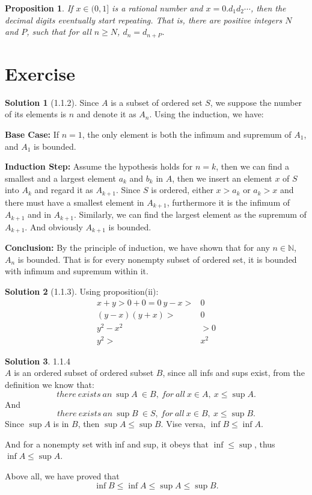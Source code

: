 \documentclass{article}
\newtheorem{proposition}{Proposition}[section]
\theoremstyle{definition}
\newtheorem{sol}{Solution}[exe]
\begin{document}
\begin{proposition}
    If $x\in (0,1]$ is a rational number and $x=0.d_{1}d_{2}\cdots$, then the decimal digits eventually start repeating. That is, there are 
    positive integers $N$ and $P$, such that for all $n\geq N$, $d_{n}=d_{n+P}$.
\end{proposition}


\newpage
\section{Exercise}

\begin{sol}[1.1.2]
    Since $A$ is a subset of ordered set $S$, we suppose the number of its elements is $n$ and denote it as $A_{n}$. Using the induction, we have:

    \noindent\textbf{Base Case:} If $n=1$, the only element is both the infimum and supremum of $A_{1}$, and $A_{1}$ is bounded.

    \noindent\textbf{Induction Step:} Assume the hypothesis holds for $n=k$, then we can find a smallest and a largest element $a_{k}$ and $b_{k}$ in $A$, 
    then we insert an element $x$ of $S$ into $A_{k}$ and regard it as $A_{k+1}$. Since $S$ is ordered, either $x>a_{k}$ or $a_{k}>x$ and there must have a smallest element in $A_{k+1}$, furthermore it is the infimum of $A_{k+1}$ and in $A_{k+1}$.
    Similarly, we can find the largest element as the supremum of $A_{k+1}$. And obviously $A_{k+1}$ is bounded.

    \noindent\textbf{Conclusion:} By the principle of induction, we have shown that for any $n\in \mathbb{N}$, $A_{n}$ is bounded. That is for every nonempty subset of ordered set, it is bounded with infimum and supremum within it.
\end{sol}

\begin{sol}[1.1.3]
Using proposition(ii):
    \begin{align*}
        x+y>0+0=0\ y-x>&0\\
        (y-x)(y+x)>&0\\
        y^{2}-x^{2}&>0\\
        y^{2}>&x^{2}
    \end{align*} 
\end{sol}


\begin{sol} 1.1.4\\
    $A$ is an ordered subset of ordered subset $B$, since all infs and sups exist, from the definition we know that:
    $$there\ exists\ an\ \sup A\ \in B,\ for\ all\ x\in A,\ x\leq \sup A.$$
    And 
    $$there\ exists\ an\ \sup B\ \in S,\ for\ all\ x\in B,\ x\leq \sup B.$$
    Since $\sup A$ is in $B$, then $\sup A\leq \sup B.$ Vise versa, $\inf B\leq\inf A.$

    And for a nonempty set with inf and sup, it obeys that $\inf\leq\sup$, thus $\inf A\leq\sup A$.
    
    Above all, we have proved that 
    $$\inf B\leq\inf A\leq\sup A\leq\sup B.$$
\end{sol}
\end{document}
